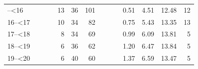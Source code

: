 \documentclass[]{elsarticle} %
\begin{document}
\begin{table}[H]
\begin{tabular}[t]{l>{}r>{}r>{}rrrr>{}r>{}r>{}rrrrr}
\addlinespace
15--<16 & \cellcolor[HTML]{ececec}{1.14} & \cellcolor[HTML]{ececec}{10.18} & \cellcolor[HTML]{ececec}{26.94} & 13 & 36 & 101 & \cellcolor[HTML]{ececec}{21.71} & \cellcolor[HTML]{ececec}{192.42} & \cellcolor[HTML]{ececec}{532.51} & 0.51 & 4.51 & 12.48 & 12\\
16--<17 & \cellcolor[HTML]{ececec}{1.59} & \cellcolor[HTML]{ececec}{12.24} & \cellcolor[HTML]{ececec}{29.87} & 10 & 34 & 82 & \cellcolor[HTML]{ececec}{31.85} & \cellcolor[HTML]{ececec}{231.87} & \cellcolor[HTML]{ececec}{569.68} & 0.75 & 5.43 & 13.35 & 13\\
17--<18 & \cellcolor[HTML]{ececec}{2.12} & \cellcolor[HTML]{ececec}{13.84} & \cellcolor[HTML]{ececec}{30.97} & 8 & 34 & 69 & \cellcolor[HTML]{ececec}{42.07} & \cellcolor[HTML]{ececec}{259.83} & \cellcolor[HTML]{ececec}{589.09} & 0.99 & 6.09 & 13.81 & 5\\
18--<19 & \cellcolor[HTML]{ececec}{2.72} & \cellcolor[HTML]{ececec}{14.96} & \cellcolor[HTML]{ececec}{30.26} & 6 & 36 & 62 & \cellcolor[HTML]{ececec}{51.08} & \cellcolor[HTML]{ececec}{276.29} & \cellcolor[HTML]{ececec}{590.75} & 1.20 & 6.47 & 13.84 & 5\\
19--<20 & \cellcolor[HTML]{ececec}{3.40} & \cellcolor[HTML]{ececec}{15.60} & \cellcolor[HTML]{ececec}{27.72} & 6 & 40 & 60 & \cellcolor[HTML]{ececec}{58.64} & \cellcolor[HTML]{ececec}{281.25} & \cellcolor[HTML]{ececec}{574.67} & 1.37 & 6.59 & 13.47 & 5\\
\bottomrule
\end{tabular}
\end{table}
\end{document}
